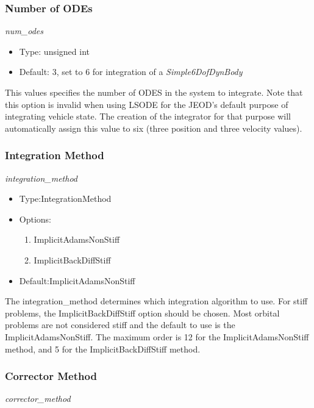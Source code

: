 \subsubsection{Number of ODEs}
\textit{num\_odes}

\begin{itemize}
\item
Type: unsigned int
\item
Default: 3, set to 6 for integration of a \textit{Simple6DofDynBody}
\end{itemize}
This values specifies the number of ODES in the system to integrate.
Note that this option is invalid when using LSODE for the JEOD's default
purpose of integrating vehicle state.  The creation of the integrator
for that purpose will automatically assign this value to six (three
position and three velocity values).

\subsubsection{Integration Method}
\textit{integration\_method}

\begin{itemize}
\item
Type:IntegrationMethod
\item
Options:
\begin{enumerate}
\item
ImplicitAdamsNonStiff
\item
ImplicitBackDiffStiff
\end{enumerate}
\item
Default:ImplicitAdamsNonStiff
\end{itemize}
The integration\_method determines which integration algorithm to use.
For stiff problems, the ImplicitBackDiffStiff option should be chosen.
Most orbital problems are not considered stiff and the default to use
is the ImplicitAdamsNonStiff.
The maximum order is 12 for the ImplicitAdamsNonStiff method, and 5 for
the ImplicitBackDiffStiff method.

\subsubsection{Corrector Method}
\textit{corrector\_method}

